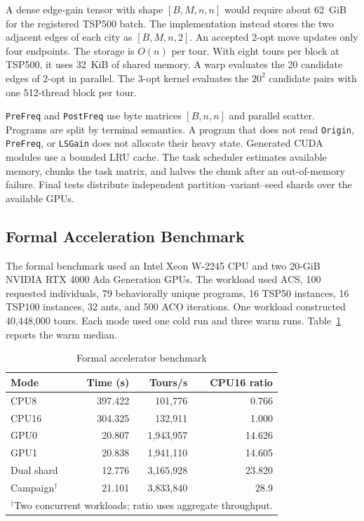\documentclass[letterpaper,journal]{IEEEtran}
\begin{document}
A dense edge-gain tensor with shape
\([B,M,n,n]\) would require about 62~GiB for the registered TSP500 batch.
The implementation instead stores the two adjacent edges of each city as
\([B,M,n,2]\).
An accepted 2-opt move updates only four endpoints.
The storage is \(O(n)\) per tour.
With eight tours per block at TSP500, it uses 32~KiB of shared memory.
A warp evaluates the 20 candidate edges of 2-opt in parallel.
The 3-opt kernel evaluates the \(20^2\) candidate pairs with one
512-thread block per tour.

\texttt{PreFreq} and \texttt{PostFreq} use byte matrices
\([B,n,n]\) and parallel scatter.
Programs are split by terminal semantics.
A program that does not read \texttt{Origin}, \texttt{PreFreq}, or
\texttt{LSGain} does not allocate their heavy state.
Generated CUDA modules use a bounded LRU cache.
The task scheduler estimates available memory, chunks the task matrix, and
halves the chunk after an out-of-memory failure.
Final tests distribute independent partition--variant--seed shards over the
available GPUs.

\subsection{Formal Acceleration Benchmark}

The formal benchmark used an Intel Xeon W-2245 CPU and two 20-GiB NVIDIA RTX 4000 Ada Generation GPUs.
The workload used ACS, 100 requested individuals, 79 behaviorally unique programs, 16 TSP50 instances, 16 TSP100 instances, 32 ants, and 500 ACO iterations.
One workload constructed 40,448,000 tours.
Each mode used one cold run and three warm runs.
Table~\ref{tab:speed} reports the warm median.

\begin{table}[t]
\caption{Formal accelerator benchmark}
\label{tab:speed}
\centering
\footnotesize
\begin{tabular}{lrrr}
\toprule
Mode & Time (s) & Tours/s & CPU16 ratio\\
\midrule
CPU8 & 397.422 & 101,776 & 0.766\\
CPU16 & 304.325 & 132,911 & 1.000\\
GPU0 & 20.807 & 1,943,957 & 14.626\\
GPU1 & 20.838 & 1,941,110 & 14.605\\
Dual shard & 12.776 & 3,165,928 & 23.820\\
Campaign$^\dagger$ & 21.101 & 3,833,840 & 28.9\\
\bottomrule
\multicolumn{4}{l}{\scriptsize $^\dagger$Two concurrent workloads; ratio uses aggregate throughput.}
\end{tabular}
\end{table}
\end{document}
